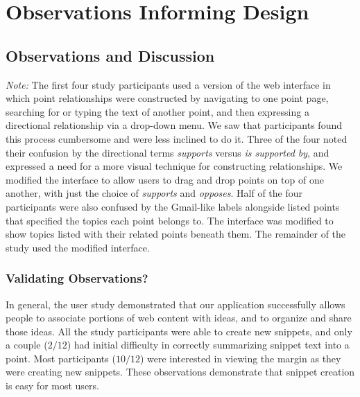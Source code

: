 \documentclass{chi2009}
\begin{document}
\section{Observations Informing Design}


\subsection{Observations and Discussion}


{\it Note:} The first four study participants used a version of the web interface in which point relationships were constructed by navigating to one point page, searching for or typing the text of another point, and then expressing a directional relationship via a drop-down menu. We saw that participants found this process cumbersome and were less inclined to do it. Three of the four noted their confusion by the directional terms {\it supports} versus {\it is supported by}, and expressed a need for a more visual technique for constructing relationships. We modified the interface to allow users to drag and drop points on top of one another, with just the choice of {\it supports} and {\it opposes}. Half of the four participants were also confused by the Gmail-like labels alongside listed points that specified the topics each point belongs to.  The interface was modified to show topics listed with their related points beneath them. The remainder of the study used the modified interface. 


\subsubsection{Validating Observations?}
In general, the user study demonstrated that our application successfully allows people to associate portions of web content with ideas, and to organize and share those ideas. All the study participants were able to create new snippets, and only a couple ($2/12$) had initial difficulty in correctly summarizing snippet text into a point. Most participants ($10/12$) were interested in viewing the margin as they were creating new snippets. These observations demonstrate that snippet creation is easy for most users.
\end{document}
